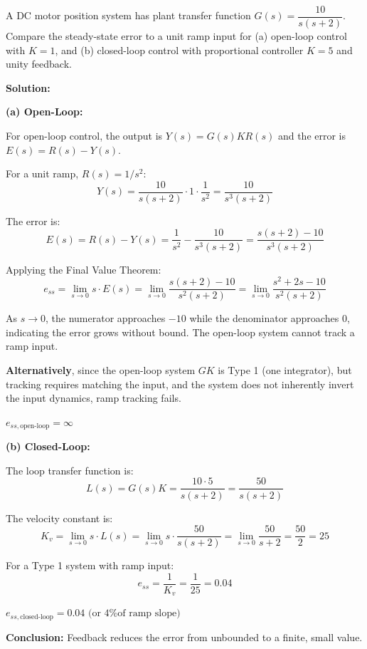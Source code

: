 \begin{example}
\label{ex:sse}
A DC motor position system has plant transfer function $G(s) = \dfrac{10}{s(s+2)}$. Compare the steady-state error to a unit ramp input for (a) open-loop control with $K = 1$, and (b) closed-loop control with proportional controller $K = 5$ and unity feedback.

\textbf{Solution:}

\textbf{(a) Open-Loop:}

For open-loop control, the output is $Y(s) = G(s) K R(s)$ and the error is $E(s) = R(s) - Y(s)$.

For a unit ramp, $R(s) = 1/s^2$:
\begin{equation*}
Y(s) = \frac{10}{s(s+2)} \cdot 1 \cdot \frac{1}{s^2} = \frac{10}{s^3(s+2)}
\end{equation*}

The error is:
\begin{equation*}
E(s) = R(s) - Y(s) = \frac{1}{s^2} - \frac{10}{s^3(s+2)} = \frac{s(s+2) - 10}{s^3(s+2)}
\end{equation*}

Applying the Final Value Theorem:
\begin{equation*}
e_{ss} = \lim_{s \to 0} s \cdot E(s) = \lim_{s \to 0} \frac{s(s+2) - 10}{s^2(s+2)} = \lim_{s \to 0} \frac{s^2 + 2s - 10}{s^2(s+2)}
\end{equation*}

As $s \to 0$, the numerator approaches $-10$ while the denominator approaches $0$, indicating the error grows without bound. The open-loop system cannot track a ramp input.

\textbf{Alternatively}, since the open-loop system $GK$ is Type 1 (one integrator), but tracking requires matching the input, and the system does not inherently invert the input dynamics, ramp tracking fails.

$\boxed{e_{ss,\text{open-loop}} = \infty}$

\textbf{(b) Closed-Loop:}

The loop transfer function is:
\begin{equation*}
L(s) = G(s) K = \frac{10 \cdot 5}{s(s+2)} = \frac{50}{s(s+2)}
\end{equation*}

The velocity constant is:
\begin{equation*}
K_v = \lim_{s \to 0} s \cdot L(s) = \lim_{s \to 0} s \cdot \frac{50}{s(s+2)} = \lim_{s \to 0} \frac{50}{s+2} = \frac{50}{2} = 25
\end{equation*}

For a Type 1 system with ramp input:
\begin{equation*}
e_{ss} = \frac{1}{K_v} = \frac{1}{25} = 0.04
\end{equation*}

$\boxed{e_{ss,\text{closed-loop}} = 0.04 \text{ (or 4\% of ramp slope)}}$

\textbf{Conclusion:} Feedback reduces the error from unbounded to a finite, small value.
\end{example}

